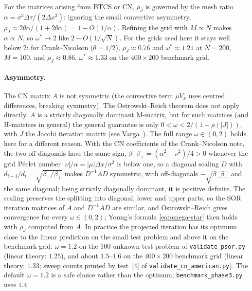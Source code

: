 \documentclass[11pt,a4paper]{article}
\begin{document}
For the matrices arising from BTCS or CN, $\rho_J$ is governed by the
mesh ratio $\alpha = \sigma^2 \Delta\tau / (2\Delta x^2)$: ignoring the
small convective asymmetry, $\rho_J \approx 2\theta\alpha / (1 +
2\theta\alpha) = 1 - O(1/\alpha)$. Refining the grid with $M \propto N$
makes $\alpha \propto N$, so $\omega^* \to 2$ like $2 - O(1/\sqrt{N})$.
For the grids used here it stays well below $2$: for Crank--Nicolson
($\theta = 1/2$), $\rho_J \approx 0.76$ and $\omega^* \approx 1.21$ at
$N = 200$, $M = 100$, and $\rho_J \approx 0.86$, $\omega^* \approx 1.33$
on the $400 \times 200$ benchmark grid.

\paragraph{Asymmetry.} The CN matrix $A$ is not symmetric (the
convective term $\mu V_x$ uses centred differences, breaking
symmetry). The Ostrowski--Reich theorem does not apply directly.
$A$ is a strictly diagonally dominant M-matrix, but for such matrices
(and H-matrices in general) the general guarantee is only
$0 < \omega < 2/(1 + \rho(|J|))$, with $J$ the Jacobi iteration matrix
(see Varga~\cite{Varga2000}). The full range $\omega \in (0, 2)$ holds
here for a different reason. With the CN coefficients of the
Crank--Nicolson note, the two off-diagonals have the same sign,
$\beta_-\beta_+ = (\alpha^2 - \nu^2)/4 > 0$ whenever the grid Péclet
number $|\nu|/\alpha = |\mu|\Delta x/\sigma^2$ is below one, so a
diagonal scaling $D$ with $d_{i+1}/d_i = \sqrt{\beta_-/\beta_+}$ makes
$D^{-1} A D$ symmetric, with off-diagonals $-\sqrt{\beta_-\beta_+}$ and
the same diagonal; being strictly diagonally dominant, it is positive
definite. The scaling preserves the splitting into diagonal, lower and
upper parts, so the SOR iteration matrices of $A$ and $D^{-1}AD$ are
similar, and Ostrowski--Reich gives convergence for every
$\omega \in (0, 2)$; Young's formula \eqref{eq:omega-star} then holds
with $\rho_J$ computed from $A$. In practice the projected iteration has
its optimum close to the linear prediction on the small test problem
and above it on the benchmark grid: $\omega = 1.2$ on the 100-unknown test
problem of \texttt{validate\_psor.py} (linear theory: $1.25$), and
about $1.5$--$1.6$ on the $400 \times 200$ benchmark grid (linear theory:
$1.33$; sweep counts printed by test~[4] of
\texttt{validate\_cn\_american.py}). The default $\omega = 1.2$ is a safe choice rather than the
optimum; \texttt{benchmark\_phase3.py} uses $1.4$.

\end{document}
